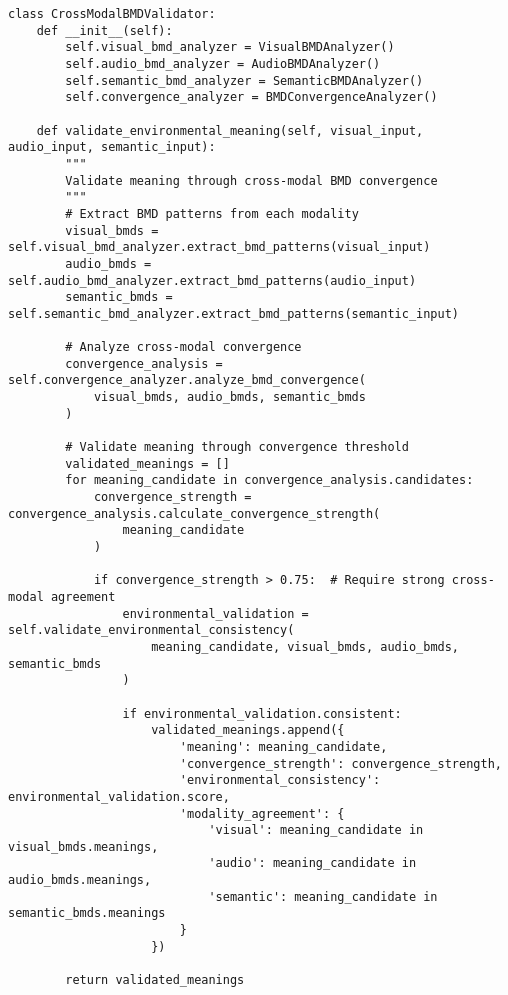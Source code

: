 \documentclass[12pt,a4paper]{article}
\begin{document}
\begin{lstlisting}[style=pythonstyle, caption=Cross-Modal BMD Process Validation]
class CrossModalBMDValidator:
    def __init__(self):
        self.visual_bmd_analyzer = VisualBMDAnalyzer()
        self.audio_bmd_analyzer = AudioBMDAnalyzer()
        self.semantic_bmd_analyzer = SemanticBMDAnalyzer()
        self.convergence_analyzer = BMDConvergenceAnalyzer()
        
    def validate_environmental_meaning(self, visual_input, audio_input, semantic_input):
        """
        Validate meaning through cross-modal BMD convergence
        """
        # Extract BMD patterns from each modality
        visual_bmds = self.visual_bmd_analyzer.extract_bmd_patterns(visual_input)
        audio_bmds = self.audio_bmd_analyzer.extract_bmd_patterns(audio_input)
        semantic_bmds = self.semantic_bmd_analyzer.extract_bmd_patterns(semantic_input)
        
        # Analyze cross-modal convergence
        convergence_analysis = self.convergence_analyzer.analyze_bmd_convergence(
            visual_bmds, audio_bmds, semantic_bmds
        )
        
        # Validate meaning through convergence threshold
        validated_meanings = []
        for meaning_candidate in convergence_analysis.candidates:
            convergence_strength = convergence_analysis.calculate_convergence_strength(
                meaning_candidate
            )
            
            if convergence_strength > 0.75:  # Require strong cross-modal agreement
                environmental_validation = self.validate_environmental_consistency(
                    meaning_candidate, visual_bmds, audio_bmds, semantic_bmds
                )
                
                if environmental_validation.consistent:
                    validated_meanings.append({
                        'meaning': meaning_candidate,
                        'convergence_strength': convergence_strength,
                        'environmental_consistency': environmental_validation.score,
                        'modality_agreement': {
                            'visual': meaning_candidate in visual_bmds.meanings,
                            'audio': meaning_candidate in audio_bmds.meanings,
                            'semantic': meaning_candidate in semantic_bmds.meanings
                        }
                    })
        
        return validated_meanings
    

\end{lstlisting}
\end{document}
